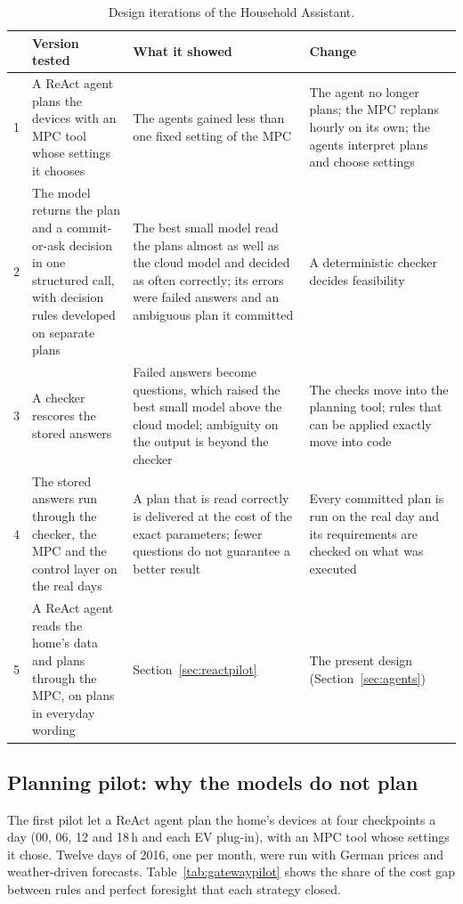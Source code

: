 \begin{table}[htbp]
\caption{Design iterations of the Household Assistant.}
\label{tab:iterations}
\small
\begin{tabularx}{\textwidth}{@{}c>{\raggedright\arraybackslash}p{3.4cm}>{\raggedright\arraybackslash}X>{\raggedright\arraybackslash}X@{}}
\toprule
 & Version tested & What it showed & Change \\
\midrule
1 & A ReAct agent plans the devices with an MPC tool whose settings it chooses & The agents gained less than one fixed setting of the MPC & The agent no longer plans; the MPC replans hourly on its own; the agents interpret plans and choose settings \\[3pt]
2 & The model returns the plan and a commit-or-ask decision in one structured call, with decision rules developed on separate plans & The best small model read the plans almost as well as the cloud model and decided as often correctly; its errors were failed answers and an ambiguous plan it committed & A deterministic checker decides feasibility \\[3pt]
3 & A checker rescores the stored answers & Failed answers become questions, which raised the best small model above the cloud model; ambiguity on the output is beyond the checker & The checks move into the planning tool; rules that can be applied exactly move into code \\[3pt]
4 & The stored answers run through the checker, the MPC and the control layer on the real days & A plan that is read correctly is delivered at the cost of the exact parameters; fewer questions do not guarantee a better result & Every committed plan is run on the real day and its requirements are checked on what was executed \\[3pt]
5 & A ReAct agent reads the home's data and plans through the MPC, on plans in everyday wording & Section~\ref{sec:reactpilot} & The present design (Section~\ref{sec:agents}) \\
\bottomrule
\end{tabularx}
\end{table}

\subsection{Planning pilot: why the models do not plan}
\label{sec:gatewaypilot}

The first pilot let a ReAct agent plan the home's devices at four
checkpoints a day (00, 06, 12 and 18\,h and each EV plug-in), with an MPC tool whose
settings it chose. Twelve days of 2016, one per month, were run with
German prices and weather-driven forecasts. Table~\ref{tab:gatewaypilot}
shows the share of the cost gap between rules and perfect foresight
that each strategy closed.

